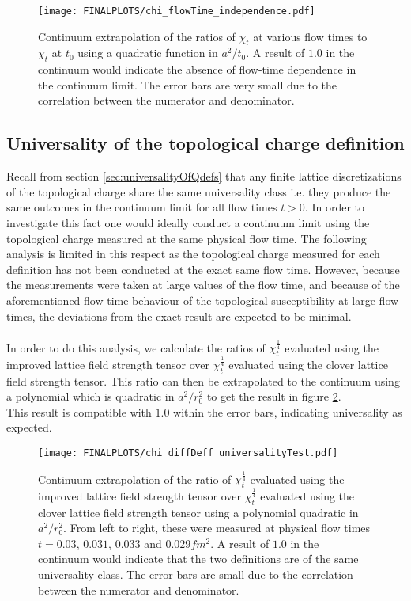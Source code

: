 \documentclass[a4paper,10pt]{book}
\begin{document}
\begin{figure}[htbp]
\centering
\texttt{[image: FINALPLOTS/chi\_flowTime\_independence.pdf]}
\caption[]{Continuum extrapolation of the ratios of $\chi_t$ at various flow times to $\chi_t$ at $t_0$ using a quadratic function in $a^2/t_0$. A result of $1.0$ in the continuum would indicate the absence of flow-time dependence in the continuum limit. The error bars are very small due to the correlation between the numerator and denominator.}\label{fig:UniversalityTest}
\end{figure}
\subsection{Universality of the topological charge definition}\label{sec:universalityOfDef}
Recall from section \ref{sec:universalityOfQdefs} that any finite lattice discretizations of the topological charge share the same universality class i.e. they produce the same outcomes in the continuum limit for all flow times $t>0$. In order to investigate this fact one would ideally conduct a continuum limit using the topological charge measured at the same physical flow time. The following analysis is limited in this respect as the topological charge measured for each definition has not been conducted at the exact same flow time. However, because the measurements were taken at large values of the flow time, and because of the aforementioned flow time behaviour of the topological susceptibility at large flow times, the deviations from the exact result are expected to be minimal.\\\\In order to do this analysis, we calculate the ratios of $\chi^{\frac{1}{4}}_t$ evaluated using the improved lattice field strength tensor over $\chi^{\frac{1}{4}}_t$ evaluated using the clover lattice field strength tensor. This ratio can then be extrapolated to the continuum using a polynomial which is quadratic in $a^2/r_0^2$ to get the result in figure \ref{fig:DefinitionUniversalityTest}.\\This result is compatible with $1.0$ within the error bars, indicating universality as expected.
\begin{figure}[htbp]
\centering
\texttt{[image: FINALPLOTS/chi\_diffDeff\_universalityTest.pdf]}
\caption[]{Continuum extrapolation of the ratio of $\chi^{\frac{1}{4}}_t$ evaluated using the improved lattice field strength tensor over $\chi^{\frac{1}{4}}_t$ evaluated using the clover lattice field strength tensor using a polynomial quadratic in $a^2/r_0^2$. From left to right, these were measured at physical flow times $t=0.03,\,0.031,\,0.033$ and $0.029fm^2$. A result of $1.0$ in the continuum would indicate that the two definitions are of the same universality class. The error bars are small due to the correlation between the numerator and denominator.}\label{fig:DefinitionUniversalityTest}
\end{figure}
\end{document}
